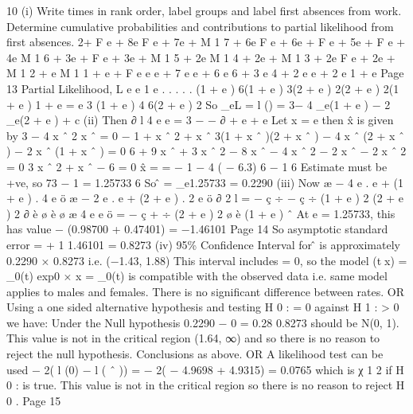 \documentclass[a4paper,1pt]{article}
\begin{document}
10
(i)
Write times in rank order, label groups and label first absences from
work.
Determine cumulative probabilities and contributions to partial likelihood
from first absences.
2+ F e  + 8e  F e  + 7e + M 1 7 + 6e  F e  + 6e + F e  + 5e + F e  + 4e  M 1 6 + 3e + F e  + 3e + M 1 5 + 2e  M 1 4 + 2e + M 1 3 + 2e  F e  + 2e + M 1 2 + e  M 1 1 + e + F e \beta e \beta
e  + 7 e \beta
e  + 6 e 
6 + 3 e 
4 + 2 e \beta
e  + 2 e 
1 + e \beta
Page 13 %
Partial Likelihood, L
e \beta
e 
1
e 
.
.
.
.
.
\beta
\beta
\beta
\beta
{}(1 + e ) 6(1 + e ) 3(2 + e ) 2(2 + e ) 2(1 + e ) 1 + e \beta
=
e 3 (1 + e \beta ) 4 6(2 + e \beta ) 2
So \log_{e}L = l (\beta) = 3\beta − 4 \log_{e}(1 + e \beta ) − 2 \log_{e}(2 + e \beta ) + c
(ii)
Then
∂ l
4 e  e \beta
= 3 −
−
∂ + e  + e \beta
Let x = e \beta then x̂ is given by
3 −
4 x ˆ
2 x ˆ
= 0
−
1 + x ˆ 2 + x ˆ
3(1 + x ˆ )(2 + x ˆ ) − 4 x ˆ (2 + x ˆ ) − 2 x ˆ (1 + x ˆ ) = 0
6 + 9 x ˆ + 3 x ˆ 2 − 8 x ˆ − 4 x ˆ 2 − 2 x ˆ − 2 x ˆ 2 = 0
3 x ˆ 2 + x ˆ − 6 = 0
x̂ =
=
− 1  − 4 ( − 6.3)
6
− 1 
6
Estimate must be +ve, so
73 − 1
= 1.25733
6
So \betâ = \log_{e}1.25733 = 0.2290
(iii)
Now
æ − 4 e \beta . e \beta + (1 + e \beta ) . 4 e \beta ö æ − 2 e \beta . e \beta + (2 + e \beta ) . 2 e \beta ö
∂ 2 l
=
−
ç
÷ − ç
÷
(1 + e \beta ) 2
(2 + e \beta ) 2
∂
è
ø è
ø
æ 4 e  e \beta ö
= − ç
+
÷
(2 + e \beta ) 2 ø
è (1 + e )
ˆ
At e \beta = 1.25733, this has value − (0.98700 + 0.47401) = −1.46101
Page 14 %
So asymptotic standard error = +
1
1.46101
= 0.8273
(iv)
95\% Confidence Interval for \betâ is approximately
0.2290  × 0.8273
i.e.
(−1.43, 1.88)
This interval includes \beta = 0, so the model
\lambda(tx) = \lambda_0(t) exp{0 × x} = \lambda_0(t)
is compatible with the observed data i.e. same model applies to males and
females. There is no significant difference between rates.
OR
Using a one sided alternative hypothesis and testing
H 0 : \beta = 0 against H 1 : \beta > 0 we have:
Under the Null hypothesis
0.2290 − 0
= 0.28
0.8273
should be N(0, 1).
This value is not in the critical region (1.64, ∞) and so there is no reason to
reject the null hypothesis. Conclusions as above.
OR
A likelihood test can be used
− 2( l (0) − l ( \beta ˆ )) = − 2( − 4.9698 + 4.9315) = 0.0765
which is χ 1 2 if H 0 :  is true. This value is not in the critical region so
there is no reason to reject H 0 .
Page 15
\end{document}
